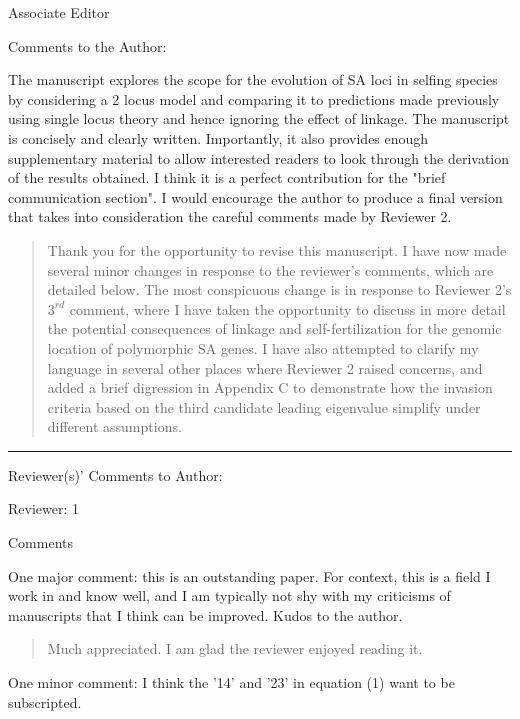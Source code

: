 \documentclass[11pt]{article}
\begin{document}
Associate Editor

\noindent Comments to the Author:
\bigskip 

The manuscript explores the scope for the evolution of SA loci in selfing species by considering a 2 locus model and comparing it to predictions made previously using single locus theory and hence ignoring the effect of linkage. The manuscript is concisely and clearly written. Importantly, it also provides enough supplementary material to allow interested readers to look through the derivation of the results obtained. I think it is a perfect contribution for the "brief communication section". I would encourage the author to produce a final version that takes into consideration the careful comments made by Reviewer 2.

	\begin{quote}
		Thank you for the opportunity to revise this manuscript. I have now made several minor changes in response to the reviewer's comments, which are detailed below. The most conspicuous change is in response to Reviewer 2's $3^{rd}$ comment, where I have taken the opportunity to discuss in more detail the potential consequences of linkage and self-fertilization for the genomic location of polymorphic SA genes. I have also attempted to clarify my language in several other places where Reviewer 2 raised concerns, and added a brief digression in Appendix C to demonstrate how the invasion criteria based on the third candidate leading eigenvalue simplify under different assumptions.
	\end{quote}

\bigskip
\noindent \rule{8cm}{0.4pt}
\bigskip

\noindent Reviewer(s)' Comments to Author:
\bigskip

\noindent Reviewer: 1
\bigskip

\noindent Comments
\bigskip

\noindent One major comment: this is an outstanding paper. For context, this is a field I work in and know well, and I am typically not shy with my criticisms of manuscripts that I think can be improved. Kudos to the author.

	\begin{quote}
		Much appreciated. I am glad the reviewer enjoyed reading it.
	\end{quote}

\noindent One minor comment: I think the '14' and '23' in equation (1) want to be subscripted.
\end{document}
